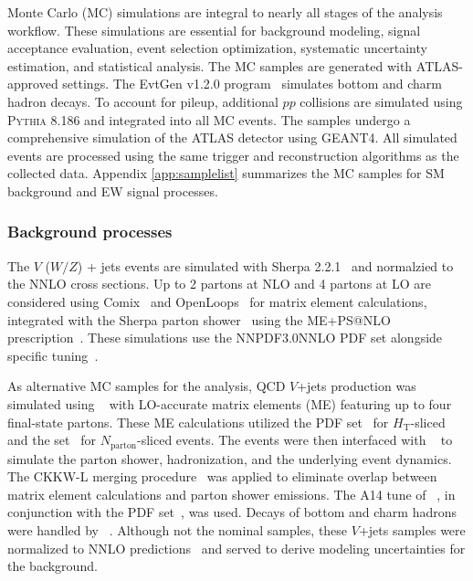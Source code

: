 Monte Carlo (MC) simulations are integral to nearly all stages of the analysis workflow. These simulations are essential for background modeling, signal acceptance evaluation, event selection optimization, systematic uncertainty estimation, and statistical analysis.
The MC samples are generated with ATLAS-approved settings.
The EvtGen v1.2.0 program~\cite{Lange:2001uf} simulates bottom and charm hadron decays. 
To account for pileup, additional $pp$ collisions are simulated using \textsc{Pythia} 8.186\cite{Sjostrand:2008vc} and integrated into all MC events. 
The samples undergo a comprehensive simulation of the ATLAS detector\cite{SOFT-2010-01} using \textsc{GEANT4}\cite{Agostinelli:2002hh}.
All simulated events are processed using the same trigger and reconstruction algorithms as the collected data.
Appendix \ref{app:samplelist} summarizes the MC samples for SM background and EW signal processes.



\subsubsection{Background processes}
The $V$ ($W/Z$) + jets events are simulated with Sherpa 2.2.1~\cite{Gleisberg:2008ta} and normalzied to the NNLO cross sections. 
Up to 2 partons at NLO and 4 partons at LO are considered using Comix~\cite{Gleisberg:2008fv} and OpenLoops~\cite{Cascioli:2011va} for matrix element calculations, integrated with the Sherpa parton shower~\cite{Schumann:2007mg} using the ME+PS@NLO prescription~\cite{Hoeche:2012yf}. 
These simulations use the NNPDF3.0NNLO PDF set alongside specific tuning~\cite{Ball_2015}. 

As alternative \Vjets MC samples for the analysis, QCD $V$+jets production was simulated using \MGNLO[2.2.2]~\cite{Alwall:2014hca} with LO-accurate matrix elements (ME) featuring up to four final-state partons. 
These ME calculations utilized the \NNPDF[3.0nlo] PDF set~\cite{Ball:2014uwa} for $H_\text{T}$-sliced and the \NNPDF[2.3lo] set~\cite{Ball:2012cx} for $N_\text{parton}$-sliced events. 
The events were then interfaced with \PYTHIA[8.186]~\cite{Sjostrand:2007gs} to simulate the parton shower, hadronization, and the underlying event dynamics.
The CKKW-L merging procedure~\cite{Lonnblad:2001iq,Lonnblad:2011xx} was applied to eliminate overlap between matrix element calculations and parton shower emissions.
The A14 tune of \PYTHIA[8]~\cite{ATL-PHYS-PUB-2014-021}, in conjunction with the \NNPDF[2.3lo] PDF set~\cite{Ball:2012cx}, was used. 
Decays of bottom and charm hadrons were handled by \EVTGEN[1.2.0]~\cite{Lange:2001uf}. 
Although not the nominal samples, these $V$+jets samples were normalized to NNLO predictions~\cite{Anastasiou:2003ds} and served to derive modeling uncertainties for the \Vjets background.

